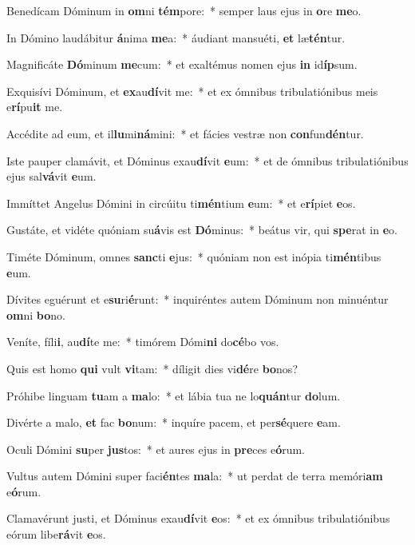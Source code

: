 \item Benedícam Dóminum in \textbf{om}ni \textbf{tém}pore:~* semper laus ejus in \textbf{o}re \textbf{me}o.
\item In Dómino laudábitur \textbf{á}nima \textbf{me}a:~* áudiant mansuéti, \textbf{et} læ\textbf{tén}tur.
\item Magnificáte \textbf{Dó}minum \textbf{me}cum:~* et exaltémus nomen ejus \textbf{in} id\textbf{íp}sum.
\item Exquisívi Dóminum, et \textbf{ex}au\textbf{dí}vit me:~* et ex ómnibus tribulatiónibus meis e\textbf{rí}pu\textbf{it} me.
\item Accédite ad eum, et il\textbf{lu}mi\textbf{ná}mini:~* et fácies vestræ non \textbf{con}fun\textbf{dén}tur.
\item Iste pauper clamávit, et Dóminus exau\textbf{dí}vit \textbf{e}um:~* et de ómnibus tribulatiónibus ejus sal\textbf{vá}vit \textbf{e}um.
\item Immíttet Angelus Dómini in circúitu ti\textbf{mén}tium \textbf{e}um:~* et e\textbf{rí}piet \textbf{e}os.
\item Gustáte, et vidéte quóniam su\textbf{á}vis est \textbf{Dó}minus:~* beátus vir, qui \textbf{spe}rat in \textbf{e}o.
\item Timéte Dóminum, omnes \textbf{sanc}ti \textbf{e}jus:~* quóniam non est inópia ti\textbf{mén}tibus \textbf{e}um.
\item Dívites eguérunt et e\textbf{su}ri\textbf{é}runt:~* inquiréntes autem Dóminum non minuéntur \textbf{om}ni \textbf{bo}no.
\item Veníte, fíli\textbf{i}, au\textbf{dí}te me:~* timórem Dómi\textbf{ni} do\textbf{cé}bo vos.
\item Quis est homo \textbf{qui} vult \textbf{vi}tam:~* díligit dies vi\textbf{dé}re \textbf{bo}nos?
\item Próhibe linguam \textbf{tu}am a \textbf{ma}lo:~* et lábia tua ne lo\textbf{quán}tur \textbf{do}lum.
\item Divérte a malo, \textbf{et} fac \textbf{bo}num:~* inquíre pacem, et per\textbf{sé}quere \textbf{e}am.
\item Oculi Dómini \textbf{su}per \textbf{jus}tos:~* et aures ejus in \textbf{pre}ces e\textbf{ó}rum.
\item Vultus autem Dómini super faci\textbf{én}tes \textbf{ma}la:~* ut perdat de terra memóri\textbf{am} e\textbf{ó}rum.
\item Clamavérunt justi, et Dóminus exau\textbf{dí}vit \textbf{e}os:~* et ex ómnibus tribulatiónibus eórum libe\textbf{rá}vit \textbf{e}os.
